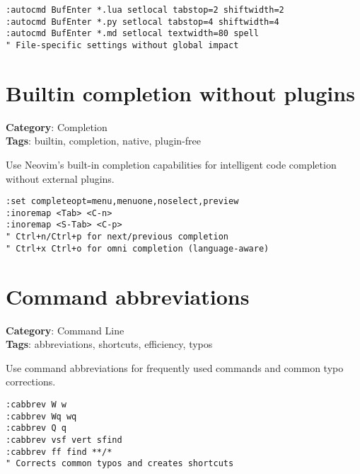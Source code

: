 {{{{\begin{Exa*}{}
\begin{Verbatim}[fontsize=\footnotesize, breaklines, breakanywhere]
:autocmd BufEnter *.lua setlocal tabstop=2 shiftwidth=2
:autocmd BufEnter *.py setlocal tabstop=4 shiftwidth=4
:autocmd BufEnter *.md setlocal textwidth=80 spell
" File-specific settings without global impact
\end{Verbatim}
\end{Exa*}

\section{Builtin completion without plugins}

\textbf{Category}: Completion\\ \textbf{Tags}: builtin, completion, native, plugin-free
\vspace{0.5cm}

Use Neovim's built-in completion capabilities for intelligent code completion without external plugins.

\begin{Exa*}{}
\begin{Verbatim}[fontsize=\footnotesize, breaklines, breakanywhere]
:set completeopt=menu,menuone,noselect,preview
:inoremap <Tab> <C-n>
:inoremap <S-Tab> <C-p>
" Ctrl+n/Ctrl+p for next/previous completion
" Ctrl+x Ctrl+o for omni completion (language-aware)
\end{Verbatim}
\end{Exa*}

\section{Command abbreviations}

\textbf{Category}: Command Line\\ \textbf{Tags}: abbreviations, shortcuts, efficiency, typos
\vspace{0.5cm}

Use command abbreviations for frequently used commands and common typo corrections.

\begin{Exa*}{}
\begin{Verbatim}[fontsize=\footnotesize, breaklines, breakanywhere]
:cabbrev W w
:cabbrev Wq wq
:cabbrev Q q
:cabbrev vsf vert sfind
:cabbrev ff find **/*
" Corrects common typos and creates shortcuts
\end{Verbatim}
\end{Exa*}

}}}}
